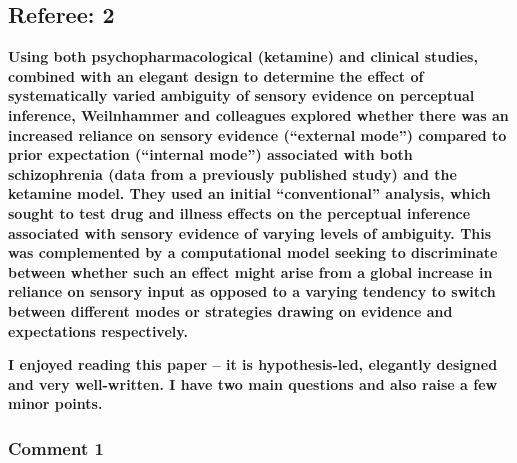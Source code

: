 \documentclass[
]{article}
\begin{document}
\subsection{Referee: 2}\label{referee-2}

\textbf{Using both psychopharmacological (ketamine) and clinical
studies, combined with an elegant design to determine the effect of
systematically varied ambiguity of sensory evidence on perceptual
inference, Weilnhammer and colleagues explored whether there was an
increased reliance on sensory evidence (``external mode'') compared to
prior expectation (``internal mode'') associated with both schizophrenia
(data from a previously published study) and the ketamine model. They
used an initial ``conventional'' analysis, which sought to test drug and
illness effects on the perceptual inference associated with sensory
evidence of varying levels of ambiguity. This was complemented by a
computational model seeking to discriminate between whether such an
effect might arise from a global increase in reliance on sensory input
as opposed to a varying tendency to switch between different modes or
strategies drawing on evidence and expectations respectively.}

\textbf{I enjoyed reading this paper -- it is hypothesis-led, elegantly
designed and very well-written. I have two main questions and also raise
a few minor points.}

\subsubsection{Comment 1}\label{comment-1-1}
\end{document}
